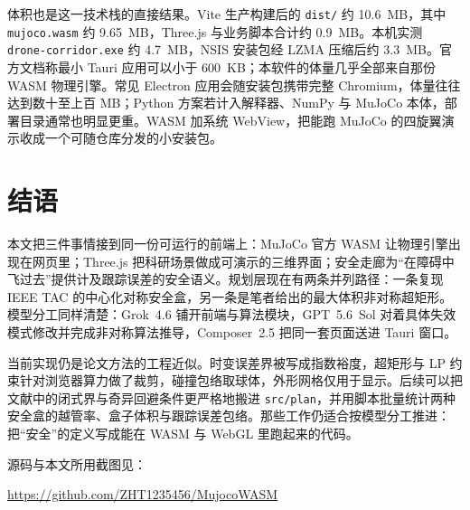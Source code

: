 \documentclass[UTF8,a4paper,11pt,zihao=-4]{ctexart}
\begin{document}
体积也是这一技术栈的直接结果。Vite 生产构建后的 \texttt{dist/} 约 10.6~MB，其中 \texttt{mujoco.wasm} 约 9.65~MB，Three.js 与业务脚本合计约 0.9~MB。本机实测 \texttt{drone-corridor.exe} 约 4.7~MB，NSIS 安装包经 LZMA 压缩后约 3.3~MB。官方文档称最小 Tauri 应用可以小于 600~KB\cite{tauri2}；本软件的体量几乎全部来自那份 WASM 物理引擎。常见 Electron 应用会随安装包携带完整 Chromium，体量往往达到数十至上百 MB；Python 方案若计入解释器、NumPy 与 MuJoCo 本体，部署目录通常也明显更重。WASM 加系统 WebView，把能跑 MuJoCo 的四旋翼演示收成一个可随仓库分发的小安装包。

\section{结语}

本文把三件事情接到同一份可运行的前端上：MuJoCo 官方 WASM 让物理引擎出现在网页里；Three.js 把科研场景做成可演示的三维界面；安全走廊为``在障碍中飞过去''提供计及跟踪误差的安全语义。规划层现在有两条并列路径：一条复现 IEEE TAC 的中心化对称安全盒\cite{serry2026reachavoid}，另一条是笔者给出的最大体积非对称超矩形\cite{zhu2026asymmetric}。模型分工同样清楚：Grok~4.6 铺开前端与算法模块，GPT~5.6~Sol 对着具体失效模式修改并完成非对称算法推导，Composer~2.5 把同一套页面送进 Tauri 窗口。

当前实现仍是论文方法的工程近似。时变误差界被写成指数裕度，超矩形与 LP 约束针对浏览器算力做了裁剪，碰撞包络取球体，外形网格仅用于显示。后续可以把文献中的闭式界与奇异回避条件更严格地搬进 \texttt{src/plan}，并用脚本批量统计两种安全盒的越管率、盒子体积与跟踪误差包络。那些工作仍适合按模型分工推进：把``安全''的定义写成能在 WASM 与 WebGL 里跑起来的代码。

源码与本文所用截图见：
\begin{center}
\url{https://github.com/ZHT1235456/MujocoWASM}
\end{center}



\end{document}
